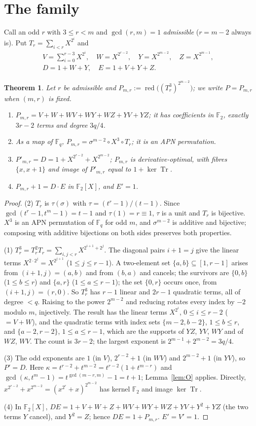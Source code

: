 \documentclass[preprint,12pt]{elsarticle}
\newtheorem{theorem}{Theorem}[section]
\theoremstyle{definition}
\newcommand{\F}{\mathbb{F}}
\newcommand{\Tr}{\operatorname{Tr}}
\newcommand{\red}{\operatorname{red}}
\begin{document}
\section{The family}\label{sec:A}
Call an odd $r$ with $3\le r<m$ and $\gcd(r,m)=1$ \emph{admissible} ($r=m-2$ always is). Put $T_r=\sum_{i<r}X^{2^i}$ and
\begin{gather*}
V=\sum_{i=0}^{r-3}X^{2^i},\quad W=X^{2^{r-2}},\quad Y=X^{2^{m-2}},\quad Z=X^{2^{m-1}},\\
D=1+W+Y,\quad E=1+V+Y+Z.
\end{gather*}
\begin{theorem}\label{thm:A}
Let $r$ be admissible and $P_{m,r}:=\red\bigl((T_r^3)^{2^{m-2}}\bigr)$; we write $P=P_{m,r}$ when $(m,r)$ is fixed.
\begin{enumerate}
\item $P_{m,r}=V+W+WV+WY+WZ+YV+YZ$; it has coefficients in $\F_2$, exactly $3r-2$ terms and degree $3q/4$.
\item As a map of $\F_q$, $P_{m,r}=\sigma^{m-2}\circ X^3\circ T_r$; it is an APN permutation.
\item $P'_{m,r}=D=1+X^{2^{r-2}}+X^{2^{m-2}}$; $P_{m,r}$ is derivative-optimal, with fibres $\{x,x+1\}$ and image of $P'_{m,r}$ equal to $1+\ker\Tr$.
\item $P_{m,r}+1=D\cdot E$ in $\F_2[X]$, and $E'=1$.
\end{enumerate}
\end{theorem}
\begin{proof}
(2) $T_r$ is $\tau(\sigma)$ with $\tau=(t^r-1)/(t-1)$. Since $\gcd(t^r-1,t^m-1)=t-1$ and $\tau(1)=r\equiv1$, $\tau$ is a unit and $T_r$ is bijective. $X^3$ is an APN permutation of $\F_q$ for odd $m$, and $\sigma^{m-2}$ is additive and bijective; composing with additive bijections on both sides preserves both properties.

(1) $T_r^3=T_r^2T_r=\sum_{i,j<r}X^{2^{i+1}+2^j}$. The diagonal pairs $i+1=j$ give the linear terms $X^{2\cdot2^j}=X^{2^{j+1}}$ ($1\le j\le r-1$). A two-element set $\{a,b\}\subseteq[1,r-1]$ arises from $(i+1,j)=(a,b)$ and from $(b,a)$ and cancels; the survivors are $\{0,b\}$ ($1\le b\le r$) and $\{a,r\}$ ($1\le a\le r-1$); the set $\{0,r\}$ occurs once, from $(i+1,j)=(r,0)$. So $T_r^3$ has $r-1$ linear and $2r-1$ quadratic terms, all of degree $<q$. Raising to the power $2^{m-2}$ and reducing rotates every index by $-2$ modulo $m$, injectively. The result has the linear terms $X^{2^i}$, $0\le i\le r-2$ ($=V+W$), and the quadratic terms with index sets $\{m-2,b-2\}$, $1\le b\le r$, and $\{a-2,r-2\}$, $1\le a\le r-1$, which are the supports of $YZ$, $YV$, $WY$ and of $WZ$, $WV$. The count is $3r-2$; the largest exponent is $2^{m-1}+2^{m-2}=3q/4$.

(3) The odd exponents are $1$ (in $V$), $2^{r-2}+1$ (in $WV$) and $2^{m-2}+1$ (in $YV$), so $P'=D$. Here $\kappa=t^{r-2}+t^{m-2}=t^{r-2}(1+t^{m-r})$ and $\gcd(\kappa,t^m-1)=t^{\gcd(m-r,m)}-1=t+1$; Lemma~\ref{lem:O} applies. Directly, $x^{2^{r-2}}+x^{2^{m-2}}=(x^{2^r}+x)^{2^{m-2}}$ has kernel $\F_2$ and image $\ker\Tr$.

(4) In $\F_2[X]$, $DE=1+V+W+Z+WV+WY+WZ+YV+Y^2+YZ$ (the two terms $Y$ cancel), and $Y^2=Z$; hence $DE=1+P_{m,r}$. $E'=V'=1$.
\end{proof}
\end{document}
